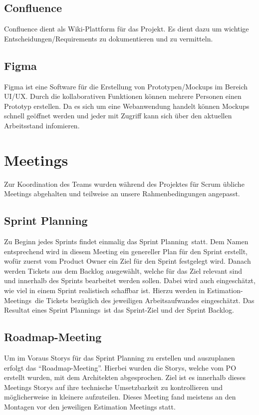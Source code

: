 \subsection{Confluence}
    Confluence dient als Wiki-Plattform für das Projekt. Es dient dazu um wichtige Entscheidungen/Requirements zu dokumentieren und zu vermitteln.
\subsection{Figma}
    Figma ist eine Software für die Erstellung von Prototypen/Mockups im Bereich UI/UX. Durch die kollaborativen Funktionen können mehrere Personen einen Prototyp erstellen.
    Da es sich um eine Webanwendung handelt können Mockups schnell geöffnet werden und jeder mit Zugriff kann sich über den aktuellen Arbeitsstand infomieren.

\section{Meetings}
Zur Koordination des Teams wurden während des Projektes für Scrum übliche Meetings abgehalten und teilweise an unsere Rahmenbedingungen angepasst.

\subsection{Sprint Planning}
Zu Beginn jedes Sprints findet einmalig das \glqq Sprint Planning\grqq~statt. Dem Namen entsprechend wird in diesem Meeting ein genereller Plan 
für den Sprint erstellt, wofür zuerst vom Product Owner ein Ziel für den Sprint festgelegt wird. Danach werden Tickets aus dem Backlog 
ausgewählt, welche für das Ziel relevant sind und innerhalb des Sprints bearbeitet werden sollen. Dabei wird auch eingeschätzt, wie viel in einem 
Sprint realistisch schaffbar ist. Hierzu werden in \glqq Estimation-Meetings\grqq~die Tickets bezüglich des jeweiligen Arbeitsaufwandes eingeschätzt.
Das Resultat eines \glqq Sprint Plannings\grqq~ist das Sprint-Ziel und der Sprint Backlog.

\subsection{Roadmap-Meeting}
Um im Voraus Storys für das Sprint Planning zu erstellen und auszuplanen erfolgt das \enquote{Roadmap-Meeting}.
Hierbei wurden die Storys, welche vom PO erstellt wurden, mit dem Architekten abgesprochen.
Ziel ist es innerhalb dieses Meetings Storys auf ihre technische Umsetzbarkeit zu kontrollieren und möglicherweise in kleinere aufzuteilen.
Dieses Meeting fand meistens an den Montagen vor den jeweiligen Estimation Meetings statt.

